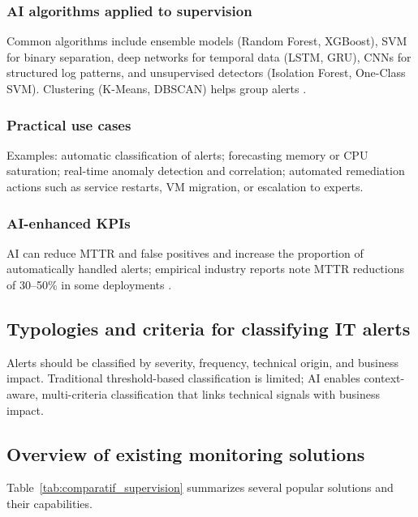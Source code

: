 \documentclass[12pt,a4paper]{article}
\begin{document}
\subsubsection*{AI algorithms applied to supervision}
Common algorithms include ensemble models (Random Forest, XGBoost), SVM for binary separation, deep networks for temporal data (LSTM, GRU), CNNs for structured log patterns, and unsupervised detectors (Isolation Forest, One-Class SVM). Clustering (K-Means, DBSCAN) helps group alerts \citep{du2017deeplog, hundman2018detecting}.

\subsubsection*{Practical use cases}
Examples: automatic classification of alerts; forecasting memory or CPU saturation; real-time anomaly detection and correlation; automated remediation actions such as service restarts, VM migration, or escalation to experts.

\subsubsection*{AI-enhanced KPIs}
AI can reduce MTTR and false positives and increase the proportion of automatically handled alerts; empirical industry reports note MTTR reductions of 30–50\% in some deployments \citep{Meta2024, Microsoft2024, Oxmaint2023}.

\subsection{Typologies and criteria for classifying IT alerts}
Alerts should be classified by severity, frequency, technical origin, and business impact. Traditional threshold-based classification is limited; AI enables context-aware, multi-criteria classification that links technical signals with business impact.

\subsection{Overview of existing monitoring solutions}
Table~\ref{tab:comparatif_supervision} summarizes several popular solutions and their capabilities.
\end{document}
